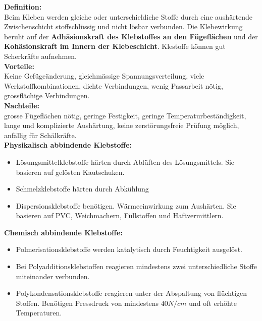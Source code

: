 \textbf{Definition:} \\
Beim Kleben werden gleiche oder unterschieldiche 
Stoffe durch eine aushärtende Zwischenschicht stoffschlüssig 
und nicht lösbar verbunden. Die Klebewirkung beruht auf der 
\textbf{Adhäsionskraft des Klebstoffes an den Fügeflächen} und der 
\textbf{Kohäsionskraft im Innern der Klebeschicht}. Klestoffe können 
gut Scherkräfte aufnehmen.\\

\textbf{Vorteile:}\\
Keine Gefügeänderung, gleichmässige Spannungsverteilung, 
viele Werkstoffkombinationen, dichte Verbindungen, 
wenig Passarbeit nötig, grossflächige Verbindungen.\\

\textbf{Nachteile:}\\
grosse Fügeflächen nötig, geringe Festigkeit, geringe Temperaturbeständigkeit, 
lange und komplizierte Aushärtung, keine 
zerstörungsfreie Prüfung möglich, anfällig für Schälkräfte.\\

\textbf{Physikalisch abbindende Klebstoffe:}
\begin{itemize}
    \item Lösungsmittelklebstoffe härten durch Ablüften des 
    Lösungsmittels. Sie basieren auf gelösten Kautschuken.
    \item Schmelzklebstoffe härten durch Abkühlung
    \item Dispersionsklebstoffe benötigen. Wärmeeinwirkung zum 
    Aushärten. Sie basieren auf PVC, Weichmachern, Füllstoffen 
    und Haftvermittlern.
\end{itemize}

\textbf{Chemisch abbindende Klebstoffe:}
\begin{itemize}
    \item Polmerisationsklebstoffe werden katalytisch durch 
    Feuchtigkeit ausgelöst.
    \item Bei Polyadditionsklebstoffen reagieren mindestens zwei 
    unterschiedliche Stoffe miteinander verbunden.
    \item Polykondensationsklebstoffe reagieren unter der Abspaltung 
    von flüchtigen Stoffen. Benötigen Pressdruck von mindestens
     $40 N/cm$ und oft erhöhte Temperaturen.
\end{itemize}